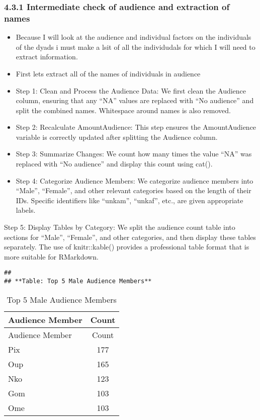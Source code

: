 \documentclass[
]{article}
\begin{document}
\hypertarget{intermediate-check-of-audience-and-extraction-of-names}{%
\subsubsection{4.3.1 Intermediate check of audience and extraction of
names}\label{intermediate-check-of-audience-and-extraction-of-names}}

\begin{itemize}
\item
  Because I will look at the audience and individual factors on the
  individuals of the dyads i must make a lsit of all the individudals
  for which I will need to extract information.
\item
  First lets extract all of the names of individuals in audience
\item
  Step 1: Clean and Process the Audience Data: We first clean the
  Audience column, ensuring that any ``NA'' values are replaced with
  ``No audience'' and split the combined names. Whitespace around names
  is also removed.
\item
  Step 2: Recalculate AmountAudience: This step ensures the
  AmountAudience variable is correctly updated after splitting the
  Audience column.
\item
  Step 3: Summarize Changes: We count how many times the value ``NA''
  was replaced with ``No audience'' and display this count using cat().
\item
  Step 4: Categorize Audience Members: We categorize audience members
  into ``Male'', ``Female'', and other relevant categories based on the
  length of their IDs. Specific identifiers like ``unkam'', ``unkaf'',
  etc., are given appropriate labels.
\end{itemize}

Step 5: Display Tables by Category: We split the audience count table
into sections for ``Male'', ``Female'', and other categories, and then
display these tables separately. The use of knitr::kable() provides a
professional table format that is more suitable for RMarkdown.

\begin{verbatim}
## 
## **Table: Top 5 Male Audience Members**
\end{verbatim}

\begin{longtable}[]{@{}lc@{}}
\caption{Top 5 Male Audience Members}\tabularnewline
\toprule
Audience Member & Count \\
\midrule
\endfirsthead
\toprule
Audience Member & Count \\
\midrule
\endhead
Pix & 177 \\
Oup & 165 \\
Nko & 123 \\
Gom & 103 \\
Ome & 103 \\
\bottomrule
\end{longtable}
\end{document}
